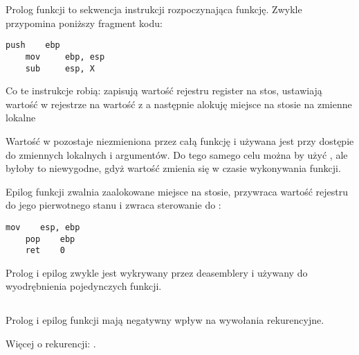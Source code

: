 \label{sec:prologepilog}

Prolog funkcji to sekwencja instrukcji rozpoczynająca funkcję. Zwykle przypomina poniższy fragment kodu:

\begin{lstlisting}[style=customasmx86]
    push    ebp
    mov     ebp, esp
    sub     esp, X
\end{lstlisting}

Co te instrukcje robią: zapisują wartość rejestru  \EBP register na stos,
ustawiają wartość w rejestrze \EBP na wartość z \ESP a następnie alokuję miejsce na stosie na zmienne lokalne

Wartość w \EBP pozostaje niezmieniona przez całą funkcję i używana jest przy dostępie do zmiennych lokalnych i argumentów.
Do tego samego celu można by użyć \ESP, ale byłoby to niewygodne, gdyż wartość \ESP zmienia się w czasie wykonywania funkcji.

Epilog funkcji zwalnia zaalokowane miejsce na stosie, przywraca wartość rejestru \EBP do jego pierwotnego stanu
i zwraca sterowanie do :

\begin{lstlisting}[style=customasmx86]
    mov    esp, ebp
    pop    ebp
    ret    0
\end{lstlisting}

Prolog i epilog zwykle jest wykrywany przez deasemblery i używany do wyodrębnienia pojedynczych funkcji.

\subsection{\Recursion}

\myindex{\Recursion}
Prolog i epilog funkcji mają negatywny wpływ na wywołania rekurencyjne.

Więcej o rekurencji: .

